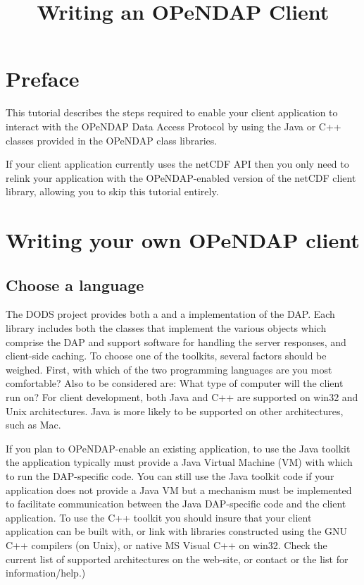 \documentclass{dods-paper}
\title{Writing an OPeNDAP Client}
\begin{document}
\maketitle


\section{Preface}

This tutorial describes the steps required to enable your client
application to interact with the OPeNDAP Data Access Protocol by using
the Java or C++ classes provided in the OPeNDAP class libraries.

If your client application currently uses the netCDF API then
you only need to relink your application with the OPeNDAP-enabled
version of the netCDF client library, allowing you to skip this
tutorial entirely.
  

\section{Writing your own OPeNDAP client}

  

\subsection{Choose a language}  

  The DODS project provides both a 
and a 
implementation of the DAP. Each library includes both the classes that 
implement the various objects which comprise the DAP and support software 
for handling the server responses, and client-side caching.  To choose one 
of the toolkits, several factors should be weighed. First,
with which of the two programming languages are you most comfortable? Also
to be considered are: What type of computer will the client run on?
For client development, both Java and C++ are supported on win32 and
Unix architectures.  Java is more likely to be supported on other
architectures, such as Mac.

If you plan to OPeNDAP-enable an existing application, to use the Java
toolkit the application typically must provide a Java Virtual Machine
(VM) with which to run the DAP-specific code.  You can still use the
Java toolkit code if your application does not provide a Java VM but a
mechanism must be implemented to facilitate communication between the
Java DAP-specific code and the client application.  To use the C++
toolkit you should insure that your client application can be built
with, or link with libraries constructed using the GNU C++ compilers
(on Unix), or native MS Visual C++ on win32.  Check the current list
of supported architectures on the web-site, or contact
 or the
list for information/help.)
\end{document}

